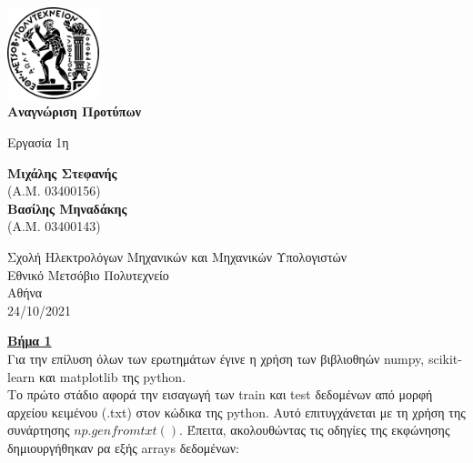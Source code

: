 \documentclass[11pt]{article} %
\begin{document}
\begin{titlepage}
    \begin{center}
        \vspace*{1cm}
	\includegraphics[width=0.2\textwidth]{plots/ntua_logo}\\    
	\vspace*{1cm}
        \Huge
        \textbf{Αναγνώριση Προτύπων}
            
        \vspace{0.5cm}
        \LARGE
        Εργασία 1η
            
        \vspace{1.5cm}
        
        \textbf{Μιχάλης Στεφανής }\\
	  (Α.Μ. 03400156)    \\
        \textbf{Βασίλης Μηναδάκης }\\
	  (Α.Μ. 03400143)
            
        \vfill
                        
        \vspace{0.8cm}
            
        
            
        \Large
        Σχολή Ηλεκτρολόγων Μηχανικών και Μηχανικών Υπολογιστών\\
        Εθνικό Μετσόβιο Πολυτεχνείο\\
        Αθήνα\\
        24/10/2021
            
    \end{center}
\end{titlepage}

\underline{\textbf{Βήμα 1}}\\

Για την επίλυση όλων των ερωτημάτων έγινε η χρήση των βιβλιοθηών numpy, scikit-learn και matplotlib της python.\\
Το πρώτο στάδιο αφορά την εισαγωγή των train και test δεδομένων από μορφή αρχείου κειμένου (.txt) στον κώδικα της python. Αυτό επιτυγχάνεται με τη χρήση της συνάρτησης $np.genfromtxt()$. Έπειτα, ακολουθώντας τις οδηγίες της εκφώνησης δημιουργήθηκαν ρα εξής arrays δεδομένων:
\end{document}

